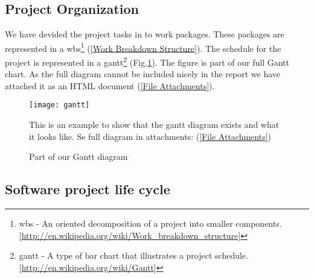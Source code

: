     

    \subsection{Project Organization}\label{Project Organization}
    
    We have devided the project tasks in to work packages. These packages are represented in a \gls{wbs}\footnote{\gls{wbs} - An oriented decomposition of a project into smaller components. [\url{http://en.wikipedia.org/wiki/Work_breakdown_structure}]} (\ref{Work Breakdown Structure}). The schedule for the project is represented in a \gls{gantt}\footnote{\gls{gantt} - A type of bar chart that illustrates a project schedule. [\url{http://en.wikipedia.org/wiki/Gantt}]} (Fig.\ref{fig:gantt}). The figure is part of our full Gantt chart. As the full diagram cannot be included nicely in the report we have attached it as an HTML document (\ref{File Attachments}).
     
        \begin{figure}[h]
            \centering
            \texttt{[image: gantt]}
            \caption{Part of our Gantt diagram} 
            This is an example to show that the gantt diagram exists and what it looks like. Se full diagram in attachments: (\ref{File Attachments})
            \label{fig:gantt}
        \end{figure}
    
    
    \subsection{Software project life cycle}\label{Software project life cycle}
    
